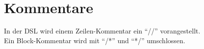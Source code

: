 \section{Kommentare}
In der \ac{DSL} wird einem Zeilen-Kommentar ein ``//'' vorangestellt.\\
Ein Block-Kommentar wird mit ``/*'' und ``*/'' umschlossen.

\endinput
